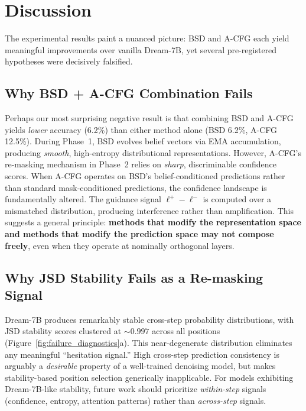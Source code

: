 \documentclass{article}
\begin{document}
\section{Discussion}
\label{sec:discussion}

The experimental results paint a nuanced picture: BSD and A-CFG each yield meaningful improvements over vanilla Dream-7B, yet several pre-registered hypotheses were decisively falsified.

\subsection{Why BSD + A-CFG Combination Fails}

Perhaps our most surprising negative result is that combining BSD and A-CFG yields \emph{lower} accuracy (6.2\%) than either method alone (BSD 6.2\%, A-CFG 12.5\%). During Phase~1, BSD evolves belief vectors via EMA accumulation, producing \emph{smooth}, high-entropy distributional representations. However, A-CFG's re-masking mechanism in Phase~2 relies on \emph{sharp}, discriminable confidence scores. When A-CFG operates on BSD's belief-conditioned predictions rather than standard mask-conditioned predictions, the confidence landscape is fundamentally altered. The guidance signal $\ell^+ - \ell^-$ is computed over a mismatched distribution, producing interference rather than amplification. This suggests a general principle: \textbf{methods that modify the representation space and methods that modify the prediction space may not compose freely}, even when they operate at nominally orthogonal layers.

\subsection{Why JSD Stability Fails as a Re-masking Signal}

Dream-7B produces remarkably stable cross-step probability distributions, with JSD stability scores clustered at ${\sim}0.997$ across all positions (Figure~\ref{fig:failure_diagnostics}a). This near-degenerate distribution eliminates any meaningful ``hesitation signal.'' High cross-step prediction consistency is arguably a \emph{desirable} property of a well-trained denoising model, but makes stability-based position selection generically inapplicable. For models exhibiting Dream-7B-like stability, future work should prioritize \emph{within-step} signals (confidence, entropy, attention patterns) rather than \emph{across-step} signals.
\end{document}
